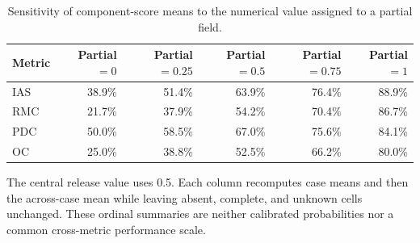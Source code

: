 \begin{table}[tp]
\centering
\caption{Sensitivity of component-score means to the numerical value assigned to a partial field.}
\label{tab:s-partial-score-sensitivity}
\begin{threeparttable}
\begin{tabular}{@{}lrrrrr@{}}
\toprule
Metric & Partial $=0$ & Partial $=0.25$ & Partial $=0.5$ & Partial $=0.75$ & Partial $=1$ \\
\midrule
IAS & 38.9\% & 51.4\% & 63.9\% & 76.4\% & 88.9\% \\
RMC & 21.7\% & 37.9\% & 54.2\% & 70.4\% & 86.7\% \\
PDC & 50.0\% & 58.5\% & 67.0\% & 75.6\% & 84.1\% \\
OC & 25.0\% & 38.8\% & 52.5\% & 66.2\% & 80.0\% \\
\bottomrule
\end{tabular}
\begin{tablenotes}[flushleft]\footnotesize
\item The central release value uses 0.5. Each column recomputes case means and then the across-case mean while leaving absent, complete, and unknown cells unchanged. These ordinal summaries are neither calibrated probabilities nor a common cross-metric performance scale.
\end{tablenotes}
\end{threeparttable}
\end{table}
